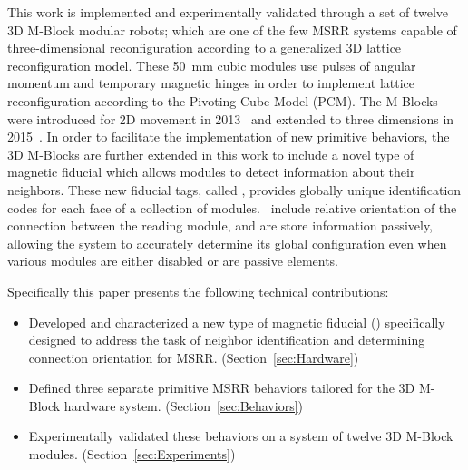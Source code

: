 This work is implemented and experimentally validated through a set of twelve 3D M-Block modular robots; which are one of the few MSRR systems capable of three-dimensional reconfiguration according to a generalized 3D lattice reconfiguration model. These 50~mm cubic modules use pulses of angular momentum and temporary magnetic hinges in order to implement lattice reconfiguration according to the Pivoting Cube Model (PCM). The M-Blocks were introduced for 2D movement in 2013~\cite{RomanishinRus-IROS13} and extended to three dimensions in 2015~\cite{Romanishin20153d}. In order to facilitate the implementation of new primitive behaviors, the 3D M-Blocks are further extended in this work to include a novel type of magnetic fiducial which allows modules to detect information about their neighbors. These new fiducial tags, called \tagNamePlural, provides globally unique identification codes for each face of a collection of modules. \TagNamePlural~include relative orientation of the connection between the reading module, and are store information passively, allowing the system to accurately determine its global configuration even when various modules are either disabled or are passive elements.

Specifically this paper presents the following technical contributions:
\begin{itemize}
	\item Developed and characterized a new type of magnetic fiducial (\TagNamePlural) specifically designed to address the task of neighbor identification and determining connection orientation for MSRR. (Section~\ref{sec:Hardware})
	\item Defined three separate primitive MSRR behaviors tailored for the 3D M-Block hardware system. (Section~\ref{sec:Behaviors})
	\item Experimentally validated these behaviors on a system of twelve 3D M-Block modules. (Section~\ref{sec:Experiments})
\end{itemize}



